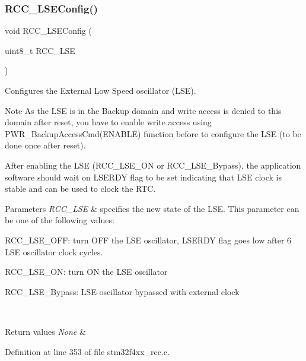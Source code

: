 \subsubsection{\texorpdfstring{R\+C\+C\+\_\+\+L\+S\+E\+Config()}{RCC\_LSEConfig()}}
{\footnotesize\ttfamily void R\+C\+C\+\_\+\+L\+S\+E\+Config (\begin{DoxyParamCaption}\item[{uint8\+\_\+t}]{R\+C\+C\+\_\+\+L\+SE }\end{DoxyParamCaption})}



Configures the External Low Speed oscillator (L\+SE). 

\begin{DoxyNote}{Note}
As the L\+SE is in the Backup domain and write access is denied to this domain after reset, you have to enable write access using P\+W\+R\+\_\+\+Backup\+Access\+Cmd(\+E\+N\+A\+B\+L\+E) function before to configure the L\+SE (to be done once after reset). 

After enabling the L\+SE (R\+C\+C\+\_\+\+L\+S\+E\+\_\+\+ON or R\+C\+C\+\_\+\+L\+S\+E\+\_\+\+Bypass), the application software should wait on L\+S\+E\+R\+DY flag to be set indicating that L\+SE clock is stable and can be used to clock the R\+TC. 
\end{DoxyNote}

\begin{DoxyParams}{Parameters}
{\em R\+C\+C\+\_\+\+L\+SE} & specifies the new state of the L\+SE. This parameter can be one of the following values\+: \begin{DoxyItemize}
\item R\+C\+C\+\_\+\+L\+S\+E\+\_\+\+O\+FF\+: turn O\+FF the L\+SE oscillator, L\+S\+E\+R\+DY flag goes low after 6 L\+SE oscillator clock cycles. \item R\+C\+C\+\_\+\+L\+S\+E\+\_\+\+ON\+: turn ON the L\+SE oscillator \item R\+C\+C\+\_\+\+L\+S\+E\+\_\+\+Bypass\+: L\+SE oscillator bypassed with external clock \end{DoxyItemize}
\\
\hline
\end{DoxyParams}

\begin{DoxyRetVals}{Return values}
{\em None} & \\
\hline
\end{DoxyRetVals}


Definition at line 353 of file stm32f4xx\+\_\+rcc.\+c.

